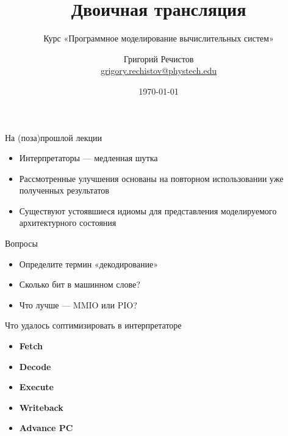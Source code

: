 \documentclass{beamer}
\title{Двоичная трансляция}
\subtitle{Курс «Программное моделирование вычислительных систем»}
\author[]{Григорий Речистов \\ \small{\href{mailto:grigory.rechistov@phystech.edu}{grigory.rechistov@phystech.edu}}}
\date{\today}
\begin{document}
\begin{frame}
    \maketitle
\end{frame}

\begin{frame}
    \tableofcontents
\end{frame}


\begin{frame}{На (поза)прошлой лекции}
\begin{itemize}
\item Интерпретаторы — медленная шутка
\item Рассмотренные улучшения основаны на повторном использовании уже полученных результатов
\item Существуют устоявшиеся идиомы для представления моделируемого архитектурного состояния
\end{itemize}
\end{frame}

\begin{frame}{Вопросы}
\begin{itemize}
\item Определите термин «декодирование» \pause
\item Сколько бит в машинном слове? \pause
\item Что лучше — MMIO или PIO?
\end{itemize}

\end{frame}


\begin{frame}{Что удалось соптимизировать в интерпретаторе}
\begin{itemize}
\item \textbf<1>{Fetch} \only<1>{$\leftarrow$ оптимизировано}
\item \textbf<1>{Decode} 
\item \textbf<2>{Execute} 
\item \textbf<2>{Writeback} 
\item \textbf<2>{Advance PC} 
\end{itemize}

\end{frame}
\end{document}
